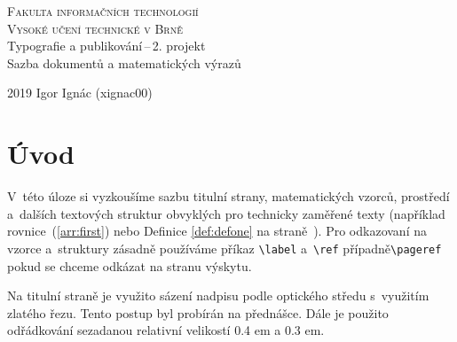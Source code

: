 \documentclass[a4paper, titlepage, twocolumn, 11pt]{article}
\theoremstyle{definition}
\theoremstyle{sentence}
\begin{document}
  \begin{titlepage}
    \begin{center}
        \Huge \textsc{Fakulta informačních technologií\\ Vysoké učení technické v Brně}\\
        \LARGE
        Typografie a publikování\,--\,2. projekt\\
        Sazba dokumentů a matematických výrazů
    \end{center}
    {\Large 2019 \hfill Igor Ignác (xignac00)}
  \end{titlepage}

\section*{Úvod}
\setlength{\parindent}{1em}
\label{fig:pageone}
V~této úloze si vyzkoušíme sazbu titulní strany, matematických vzorců, prostředí a~dalších textových struktur obvyklých pro technicky zaměřené texty (například rovnice~(\ref{arr:first}) nebo Definice \ref{def:defone} na straně~\pageref{fig:pageone}). Pro odkazovaní na vzorce a~struktury zásadně používáme příkaz \verb|\label| a~\verb|\ref| případně\verb|\pageref| pokud se chceme odkázat na stranu výskytu.
\par
Na titulní straně je využito sázení nadpisu podle optického středu s~využitím zlatého řezu. Tento postup byl probírán na přednášce. Dále je použito odřádkování sezadanou relativní velikostí 0.4 em a 0.3 em.
\end{document}
